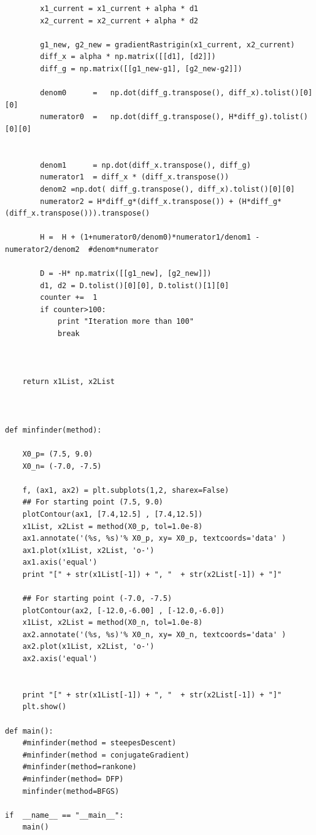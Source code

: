 \documentclass{article}
\begin{document}
\begin{lstlisting}
        x1_current = x1_current + alpha * d1
        x2_current = x2_current + alpha * d2

        g1_new, g2_new = gradientRastrigin(x1_current, x2_current)
        diff_x = alpha * np.matrix([[d1], [d2]])
        diff_g = np.matrix([[g1_new-g1], [g2_new-g2]])

        denom0      =   np.dot(diff_g.transpose(), diff_x).tolist()[0][0]
        numerator0  =   np.dot(diff_g.transpose(), H*diff_g).tolist()[0][0]


        denom1      = np.dot(diff_x.transpose(), diff_g)
        numerator1  = diff_x * (diff_x.transpose())
        denom2 =np.dot( diff_g.transpose(), diff_x).tolist()[0][0]
        numerator2 = H*diff_g*(diff_x.transpose()) + (H*diff_g*(diff_x.transpose())).transpose()

        H =  H + (1+numerator0/denom0)*numerator1/denom1 - numerator2/denom2  #denom*numerator

        D = -H* np.matrix([[g1_new], [g2_new]])
        d1, d2 = D.tolist()[0][0], D.tolist()[1][0]
        counter +=  1
        if counter>100:
            print "Iteration more than 100"
            break



    return x1List, x2List



def minfinder(method):

    X0_p= (7.5, 9.0)
    X0_n= (-7.0, -7.5)

    f, (ax1, ax2) = plt.subplots(1,2, sharex=False)
    ## For starting point (7.5, 9.0)
    plotContour(ax1, [7.4,12.5] , [7.4,12.5])
    x1List, x2List = method(X0_p, tol=1.0e-8)
    ax1.annotate('(%s, %s)'% X0_p, xy= X0_p, textcoords='data' )
    ax1.plot(x1List, x2List, 'o-')
    ax1.axis('equal')
    print "[" + str(x1List[-1]) + ", "  + str(x2List[-1]) + "]"

    ## For starting point (-7.0, -7.5)
    plotContour(ax2, [-12.0,-6.00] , [-12.0,-6.0])
    x1List, x2List = method(X0_n, tol=1.0e-8)
    ax2.annotate('(%s, %s)'% X0_n, xy= X0_n, textcoords='data' )
    ax2.plot(x1List, x2List, 'o-')
    ax2.axis('equal')


    print "[" + str(x1List[-1]) + ", "  + str(x2List[-1]) + "]"
    plt.show()

def main():
    #minfinder(method = steepesDescent)
    #minfinder(method = conjugateGradient)
    #minfinder(method=rankone)
    #minfinder(method= DFP)
    minfinder(method=BFGS)

if  __name__ == "__main__":
    main()
\end{lstlisting}
\end{document}
